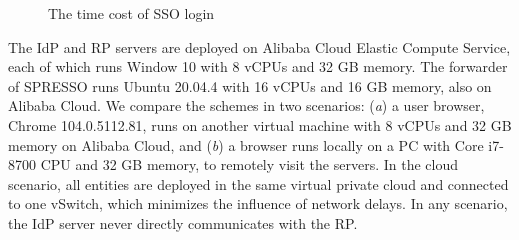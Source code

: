 \begin{figure}[tb]
  \centering
  \caption{The time cost of SSO login}
  \label{fig:evaluation}
\end{figure}


The IdP and RP servers are deployed on Alibaba Cloud Elastic Compute Service,
      each of which runs Window 10 with 8 vCPUs and 32 GB memory.
The forwarder of SPRESSO runs Ubuntu 20.04.4 with 16 vCPUs and 16 GB memory,
    also on Alibaba Cloud.
We compare the schemes in two scenarios:
    (\emph{a}) a user browser, Chrome 104.0.5112.81, runs on another virtual machine with 8 vCPUs and 32 GB memory on Alibaba Cloud,
        and (\emph{b}) a browser runs locally on a PC with Core i7-8700 CPU and 32 GB memory, to remotely visit the servers.
In the cloud scenario, all entities are deployed in the same virtual private cloud and connected to one vSwitch,
    which minimizes the influence of network delays.
In any scenario, the IdP server never directly communicates with the RP.

